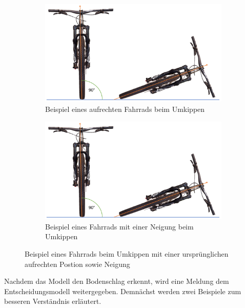 \begin{figure}
	\centering
	\begin{subfigure}{0.49\textwidth}
		\centering
		\includegraphics[page = 1, width=\textwidth]{Bilder/BicycleGroundHit2Angles.pdf}
		\caption{Beispiel eines aufrechten Fahrrads beim Umkippen}
		\label{fig:BicycleGroundHit2Angles1}
	\end{subfigure}
	\begin{subfigure}{0.49\textwidth}
		\centering
		\includegraphics[page = 2, width=\textwidth]{Bilder/BicycleGroundHit2Angles.pdf}
		\caption{Beispiel eines Fahrrads mit einer Neigung beim Umkippen}
		\label{fig:BicycleGroundHit2Angles2}
	\end{subfigure}
	\caption{Beispiel eines Fahrrads beim Umkippen mit einer ursprünglichen aufrechten Postion sowie Neigung}
	\label{fig:BicycleGroundHit2Angles}
\end{figure}

Nachdem das Modell den Bodenschlag erkennt, wird eine Meldung dem Entscheidungsmodell weitergegeben. Demnächst werden zwei Beispiele zum besseren Verständnis erläutert.

